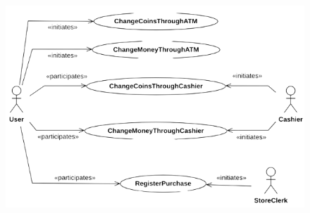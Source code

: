\begin{enumerate}
\begin{figure}[H]
            \includegraphics[width=0.9\linewidth]{images/usecase2.png}
        \end{figure}
\end{enumerate}